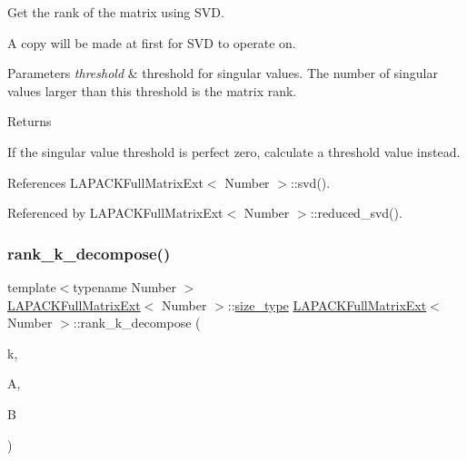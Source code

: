 Get the rank of the matrix using S\+VD.

A copy will be made at first for S\+VD to operate on. 
\begin{DoxyParams}{Parameters}
{\em threshold} & threshold for singular values. The number of singular values larger than this threshold is the matrix rank. \\
\hline
\end{DoxyParams}
\begin{DoxyReturn}{Returns}

\end{DoxyReturn}
If the singular value threshold is perfect zero, calculate a threshold value instead.

References L\+A\+P\+A\+C\+K\+Full\+Matrix\+Ext$<$ Number $>$\+::svd().



Referenced by L\+A\+P\+A\+C\+K\+Full\+Matrix\+Ext$<$ Number $>$\+::reduced\+\_\+svd().

\mbox{\label{classLAPACKFullMatrixExt_ab28877de241a7f5f901fa612c6352ce9}} 
\subsubsection{\texorpdfstring{rank\+\_\+k\+\_\+decompose()}{rank\_k\_decompose()}\hspace{0.1cm}{\footnotesize\ttfamily [1/5]}}
{\footnotesize\ttfamily template$<$typename Number $>$ \\
\hyperlink{classLAPACKFullMatrixExt}{L\+A\+P\+A\+C\+K\+Full\+Matrix\+Ext}$<$ Number $>$\+::\hyperlink{classLAPACKFullMatrixExt_a5cf5f4a6104dc17029210b5ca52bf574}{size\+\_\+type} \hyperlink{classLAPACKFullMatrixExt}{L\+A\+P\+A\+C\+K\+Full\+Matrix\+Ext}$<$ Number $>$\+::rank\+\_\+k\+\_\+decompose (\begin{DoxyParamCaption}\item[{const unsigned int}]{k,  }\item[{\hyperlink{classLAPACKFullMatrixExt}{L\+A\+P\+A\+C\+K\+Full\+Matrix\+Ext}$<$ Number $>$ \&}]{A,  }\item[{\hyperlink{classLAPACKFullMatrixExt}{L\+A\+P\+A\+C\+K\+Full\+Matrix\+Ext}$<$ Number $>$ \&}]{B }\end{DoxyParamCaption})}

